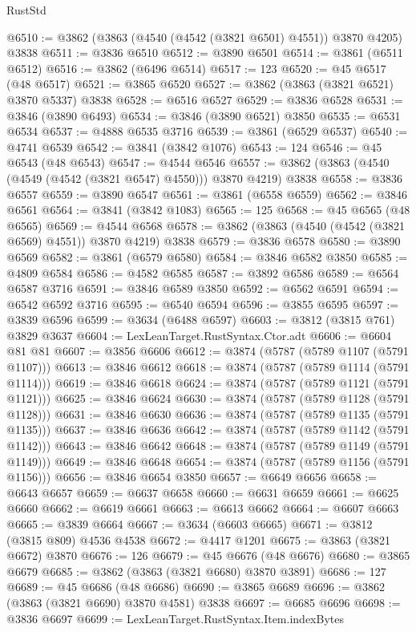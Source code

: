 \begin{lexlean}{RustStd}
\begin{coremodule}
@6510 := @3862 (@3863 (@4540 (@4542 (@3821 @6501) @4551)) @3870 @4205) @3838
@6511 := @3836 @6510
@6512 := @3890 @6501
@6514 := @3861 (@6511 @6512)
@6516 := @3862 (@6496 @6514)
@6517 := 123
@6520 := @45 @6517 (@48 @6517)
@6521 := @3865 @6520
@6527 := @3862 (@3863 (@3821 @6521) @3870 @5337) @3838
@6528 := @6516 @6527
@6529 := @3836 @6528
@6531 := @3846 (@3890 @6493)
@6534 := @3846 (@3890 @6521) @3850
@6535 := @6531 @6534
@6537 := @4888 @6535 @3716
@6539 := @3861 (@6529 @6537)
@6540 := @4741 @6539
@6542 := @3841 (@3842 @1076)
@6543 := 124
@6546 := @45 @6543 (@48 @6543)
@6547 := @4544 @6546
@6557 := @3862 (@3863 (@4540 (@4549 (@4542 (@3821 @6547) @4550))) @3870 @4219) @3838
@6558 := @3836 @6557
@6559 := @3890 @6547
@6561 := @3861 (@6558 @6559)
@6562 := @3846 @6561
@6564 := @3841 (@3842 @1083)
@6565 := 125
@6568 := @45 @6565 (@48 @6565)
@6569 := @4544 @6568
@6578 := @3862 (@3863 (@4540 (@4542 (@3821 @6569) @4551)) @3870 @4219) @3838
@6579 := @3836 @6578
@6580 := @3890 @6569
@6582 := @3861 (@6579 @6580)
@6584 := @3846 @6582 @3850
@6585 := @4809 @6584
@6586 := @4582 @6585
@6587 := @3892 @6586
@6589 := @6564 @6587 @3716
@6591 := @3846 @6589 @3850
@6592 := @6562 @6591
@6594 := @6542 @6592 @3716
@6595 := @6540 @6594
@6596 := @3855 @6595
@6597 := @3839 @6596
@6599 := @3634 (@6488 @6597)
@6603 := @3812 (@3815 @761) @3829 @3637
@6604 := LexLeanTarget.RustSyntax.Ctor.adt
@6606 := @6604 @81 @81
@6607 := @3856 @6606
@6612 := @3874 (@5787 (@5789 @1107 (@5791 @1107)))
@6613 := @3846 @6612
@6618 := @3874 (@5787 (@5789 @1114 (@5791 @1114)))
@6619 := @3846 @6618
@6624 := @3874 (@5787 (@5789 @1121 (@5791 @1121)))
@6625 := @3846 @6624
@6630 := @3874 (@5787 (@5789 @1128 (@5791 @1128)))
@6631 := @3846 @6630
@6636 := @3874 (@5787 (@5789 @1135 (@5791 @1135)))
@6637 := @3846 @6636
@6642 := @3874 (@5787 (@5789 @1142 (@5791 @1142)))
@6643 := @3846 @6642
@6648 := @3874 (@5787 (@5789 @1149 (@5791 @1149)))
@6649 := @3846 @6648
@6654 := @3874 (@5787 (@5789 @1156 (@5791 @1156)))
@6656 := @3846 @6654 @3850
@6657 := @6649 @6656
@6658 := @6643 @6657
@6659 := @6637 @6658
@6660 := @6631 @6659
@6661 := @6625 @6660
@6662 := @6619 @6661
@6663 := @6613 @6662
@6664 := @6607 @6663
@6665 := @3839 @6664
@6667 := @3634 (@6603 @6665)
@6671 := @3812 (@3815 @809) @4536 @4538
@6672 := @4417 @1201
@6675 := @3863 (@3821 @6672) @3870
@6676 := 126
@6679 := @45 @6676 (@48 @6676)
@6680 := @3865 @6679
@6685 := @3862 (@3863 (@3821 @6680) @3870 @3891)
@6686 := 127
@6689 := @45 @6686 (@48 @6686)
@6690 := @3865 @6689
@6696 := @3862 (@3863 (@3821 @6690) @3870 @4581) @3838
@6697 := @6685 @6696
@6698 := @3836 @6697
@6699 := LexLeanTarget.RustSyntax.Item.indexBytes

\end{coremodule}
\end{lexlean}
